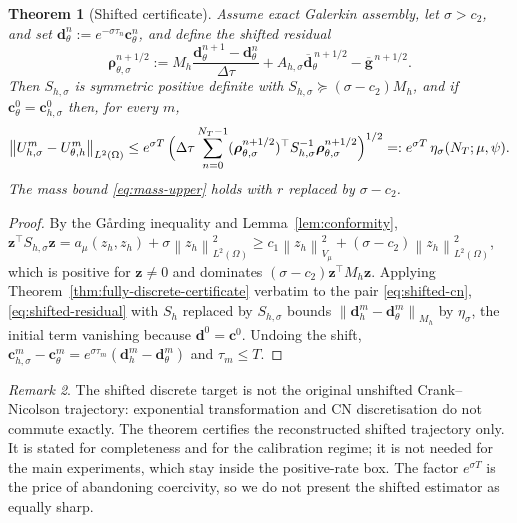 \documentclass[11pt]{amsart}
\newtheorem{theorem}{Theorem}[section]
\theoremstyle{remark}
\newtheorem{remark}[theorem]{Remark}
\newcommand{\Vmu}{V_{\mu}}
\newcommand{\Mh}{M_h}
\newcommand{\Sh}{S_h}
\newcommand{\norm}[1]{\left\lVert #1\right\rVert}
\newcommand{\dt}{\Delta\tau}
\newcommand{\cc}{\mathbf c}
\newcommand{\rr}{\bm\rho}
\newcommand{\zz}{\mathbf z}
\newcommand{\rf}{r}
\begin{document}
\begin{theorem}[Shifted certificate]
\label{thm:shifted-certificate}
Assume exact Galerkin assembly, let $\sigma>c_2$, and set $\mathbf d_\theta^n:=e^{-\sigma\tau_n}\cc_\theta^n$, and
define the shifted residual
\begin{equation}
  \rr_{\theta,\sigma}^{n+1/2}
  :=\Mh\frac{\mathbf d_\theta^{n+1}-\mathbf d_\theta^{n}}{\dt}
   +A_{h,\sigma}\overline{\mathbf d}_\theta^{\,n+1/2}
   -\overline{\mathbf g}^{\,n+1/2}.
  \label{eq:shifted-residual}
\end{equation}
Then $S_{h,\sigma}$ is symmetric positive definite with
$S_{h,\sigma}\succeq(\sigma-c_2)\Mh$, and if
$\cc_\theta^0=\cc_{h,\sigma}^0$ then, for every $m$,
\begin{equation}
  \norm{U_{h,\sigma}^m-U_{\theta,h}^m}_{L^2(\Omega)}
  \le e^{\sigma T}\,
  \Bigl(
  \dt\sum_{n=0}^{N_T-1}
  (\rr_{\theta,\sigma}^{n+1/2})^\top S_{h,\sigma}^{-1}\rr_{\theta,\sigma}^{n+1/2}
  \Bigr)^{1/2}
  =:e^{\sigma T}\,\eta_{\sigma}(N_T;\mu,\psi).
  \label{eq:shifted-certificate}
\end{equation}
The mass bound \eqref{eq:mass-upper} holds with $\rf$ replaced by
$\sigma-c_2$.
\end{theorem}

\begin{proof}
By the G\aa rding inequality and Lemma~\ref{lem:conformity},
$\zz^\top S_{h,\sigma}\zz=a_\mu(z_h,z_h)+\sigma\norm{z_h}^2_{L^2(\Omega)}
\ge c_1\norm{z_h}_{\Vmu}^2+(\sigma-c_2)\norm{z_h}^2_{L^2(\Omega)}$, which is
positive for $\zz\ne0$ and dominates $(\sigma-c_2)\zz^\top\Mh\zz$.  Applying
Theorem~\ref{thm:fully-discrete-certificate} verbatim to the pair
\eqref{eq:shifted-cn}, \eqref{eq:shifted-residual} with $\Sh$ replaced by
$S_{h,\sigma}$ bounds
$\norm{\mathbf d_h^m-\mathbf d_\theta^m}_{\Mh}$ by $\eta_\sigma$, the initial
term vanishing because $\mathbf d^0=\cc^0$.  Undoing the shift,
$\cc_{h,\sigma}^m-\cc_\theta^m=e^{\sigma\tau_m}(\mathbf d_h^m-\mathbf d_\theta^m)$ and
$\tau_m\le T$.
\end{proof}

\begin{remark}
The shifted discrete target is not the original unshifted
Crank--Nicolson trajectory: exponential transformation and CN discretisation
do not commute exactly. The theorem certifies the reconstructed shifted
trajectory only. It is stated for completeness and for the
calibration regime; it is not needed for the main experiments, which stay
inside the positive-rate box.  The factor $e^{\sigma T}$ is the price of abandoning coercivity, so we do
not present the shifted estimator as equally sharp.
\end{remark}
\end{document}
